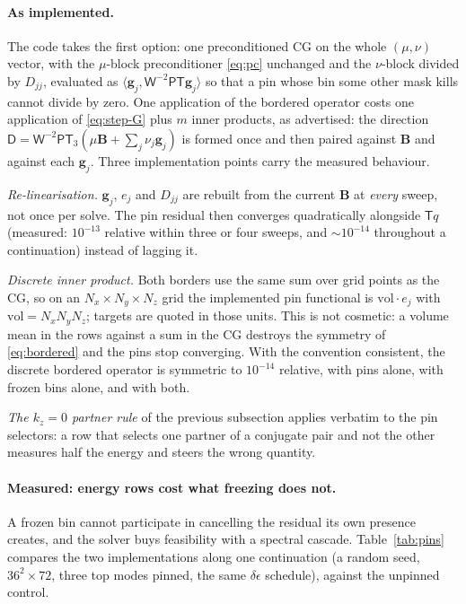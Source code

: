 \documentclass[11pt]{article}
\theoremstyle{definition}
\newcommand{\B}{\mathbf{B}}
\newcommand{\gv}{\mathbf{g}}
\newcommand{\Tr}{\mathsf{T}}
\newcommand{\Trr}{\mathsf{T}_3}
\newcommand{\Pl}{\mathsf{P}}
\newcommand{\Wm}{\mathsf{W}}
\begin{document}
\paragraph{As implemented.} The code takes the first option: one
preconditioned CG on the whole $(\mu,\nu)$ vector, with the $\mu$-block
preconditioner \eqref{eq:pc} unchanged and the $\nu$-block divided by
$D_{jj}$, evaluated as $\langle\gv_j,\Wm^{-2}\Pl\Tr\gv_j\rangle$ so that a
pin whose bin some other mask kills cannot divide by zero. One application of
the bordered operator costs one application of \eqref{eq:step-G} plus $m$
inner products, as advertised: the direction
$\mathsf D=\Wm^{-2}\Pl\Trr(\mu\B+\sum_j\nu_j\gv_j)$ is formed once and then
paired against $\B$ and against each $\gv_j$. Three implementation points
carry the measured behaviour.

\emph{Re-linearisation.} $\gv_j$, $e_j$ and $D_{jj}$ are rebuilt from the
current $\B$ at \emph{every} sweep, not once per solve. The pin residual then
converges quadratically alongside $\Tr q$ (measured: $10^{-13}$ relative
within three or four sweeps, and $\sim10^{-14}$ throughout a continuation)
instead of lagging it.

\emph{Discrete inner product.} Both borders use the same sum over grid points
as the CG, so on an $N_x\!\times\!N_y\!\times\!N_z$ grid the implemented pin
functional is $\mathrm{vol}\cdot e_j$ with $\mathrm{vol}=N_xN_yN_z$; targets
are quoted in those units. This is not cosmetic: a volume mean in the rows
against a sum in the CG destroys the symmetry of \eqref{eq:bordered} and the
pins stop converging. With the convention consistent, the discrete bordered
operator is symmetric to $10^{-14}$ relative, with pins alone, with frozen
bins alone, and with both.

\emph{The $k_z=0$ partner rule} of the previous subsection applies verbatim to
the pin selectors: a row that selects one partner of a conjugate pair and not
the other measures half the energy and steers the wrong quantity.

\paragraph{Measured: energy rows cost what freezing does not.} A frozen bin
cannot participate in cancelling the residual its own presence creates, and
the solver buys feasibility with a spectral cascade. Table~\ref{tab:pins}
compares the two implementations along one continuation (a random seed,
$36^2\times72$, three top modes pinned, the same $\delta\epsilon$ schedule),
against the unpinned control.
\end{document}
